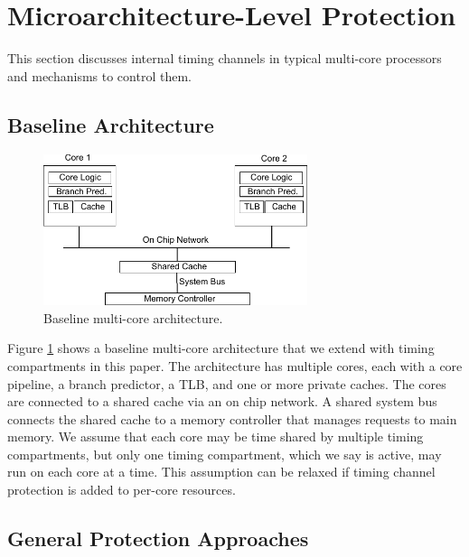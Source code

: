 \section{Microarchitecture-Level Protection}

This section discusses internal timing channels in typical
multi-core processors and mechanisms to control them.

\subsection{Baseline Architecture}

    \begin{figure}
        \begin{center}
            \includegraphics[width=3.04in]{figs/baseline.pdf}
            \caption{Baseline multi-core architecture.}
            \label{fig:baseline}
        \end{center}
    \end{figure}

Figure \ref{fig:baseline} shows a baseline multi-core architecture that we
extend with timing compartments in this paper. The architecture
has multiple cores, each with a core pipeline, a branch predictor, a TLB,
and one or more private caches. 
The cores are connected to a shared cache via an on chip network. A shared system 
bus connects the shared cache to a memory controller that manages requests to 
main memory.
We assume that each core may be time shared by multiple timing
compartments, but only one timing compartment, which we say is active, may run on each core
at a time. This assumption can be relaxed if timing channel protection
is added to per-core resources.



\subsection{General Protection Approaches}
\label{sec:general_approaches}

